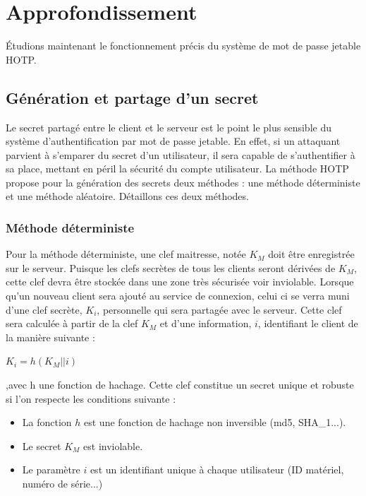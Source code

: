 \documentclass{../res/univ-projet}
\begin{document}
\section{Approfondissement}
  Étudions maintenant le fonctionnement précis du système de mot de passe jetable \og{}HOTP\fg{}.
  \subsection{Génération et partage d'un secret}
    Le secret partagé entre le client et le serveur est le point le plus sensible du système d'authentification par mot de passe jetable. En effet, si un attaquant 
    parvient à s'emparer du secret d'un utilisateur, il sera capable de s'authentifier à sa place, mettant en péril la sécurité du compte utilisateur. La méthode 
    \og{}HOTP\fg{} propose pour la génération des secrets deux méthodes : une méthode déterministe et une méthode aléatoire. Détaillons ces deux méthodes.
    
    \subsubsection{Méthode déterministe}
    Pour la méthode déterministe, une clef maitresse, notée $K_M$ doit être enregistrée sur le serveur. Puisque les clefs secrètes de tous les clients seront dérivées 
    de $K_M$, cette clef devra être stockée dans une zone très sécurisée voir inviolable. Lorsque qu'un nouveau client sera ajouté au service de connexion, celui ci
    se verra muni d'une clef secrète, $K_i$, personnelle qui sera partagée avec le serveur. Cette clef sera calculée à partir de la clef $K_M$ et d'une information, $i$, 
    identifiant le client de la manière suivante : \newline
    \begin{center}
     $K_i = h(K_M || i)$ 
    \end{center}
    \hfill{},avec h une fonction de hachage.\newline
    Cette clef constitue un secret unique et robuste si l'on respecte les conditions suivante :
    \begin{itemize}
     \item La fonction $h$ est une fonction de hachage non inversible (md5, SHA\_1...).
     \item Le secret $K_M$ est inviolable.
     \item Le paramètre $i$ est un identifiant unique à chaque utilisateur (ID matériel, numéro de série...)
    \end{itemize}
    
\end{document}

